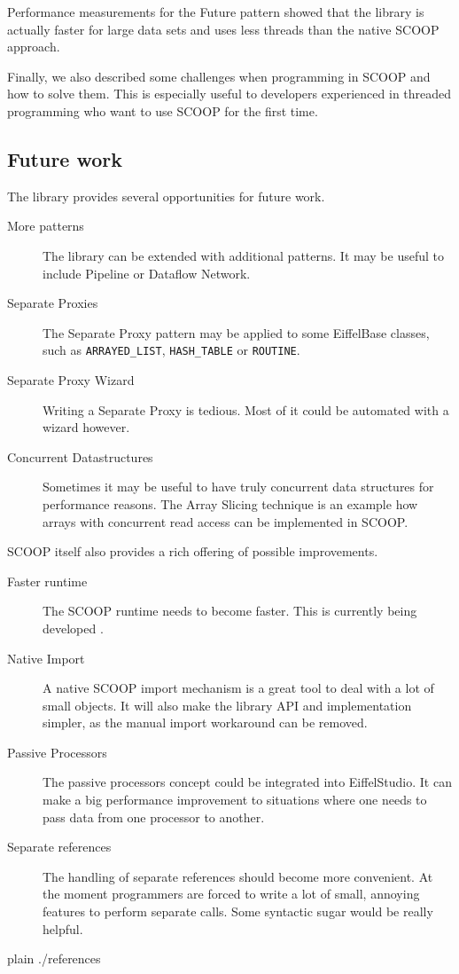 \documentclass[a4paper,10pt,titlepage]{article}
\begin{document}
Performance measurements for the Future pattern showed that the library is actually faster for large data sets and uses less threads than the native SCOOP approach.

Finally, we also described some challenges when programming in SCOOP and how to solve them.
This is especially useful to developers experienced in threaded programming who want to use SCOOP for the first time.

\subsection{Future work}

The library provides several opportunities for future work.

\begin{description}
 \item [More patterns] The library can be extended with additional patterns.
 It may be useful to include Pipeline or Dataflow Network.
 \item [Separate Proxies] The Separate Proxy pattern may be applied to some EiffelBase classes, such as \lstinline!ARRAYED_LIST!, \lstinline!HASH_TABLE! or \lstinline!ROUTINE!.
 \item [Separate Proxy Wizard] Writing a Separate Proxy is tedious. Most of it could be automated with a wizard however.
 \item [Concurrent Datastructures] Sometimes it may be useful to have truly concurrent data structures for performance reasons.
The Array Slicing technique \cite{paper:array-slicing} is an example how arrays with concurrent read access can be implemented in SCOOP.
\end{description}

SCOOP itself also provides a rich offering of possible improvements.

\begin{description}
 \item [Faster runtime] The SCOOP runtime needs to become faster. 
 This is currently being developed \cite{thesis:scottwest}.
 \item [Native Import] A native SCOOP import mechanism is a great tool to deal with a lot of small objects.
 It will also make the library API and implementation simpler, as the manual import workaround can be removed.
 \item [Passive Processors] The passive processors concept \cite{paper:passive-processors} could be integrated into EiffelStudio.
 It can make a big performance improvement to situations where one needs to pass data from one processor to another.
 \item [Separate references] The handling of separate references should become more convenient.
 At the moment programmers are forced to write a lot of small, annoying features to perform separate calls.
 Some syntactic sugar would be really helpful.
\end{description}

\newpage
\begin{appendices}



\end{appendices}

\newpage
{}
{}
\begin{flushleft}
{{{
 {plain}
 {./references}
}}}
\end{flushleft}
\end{document}
